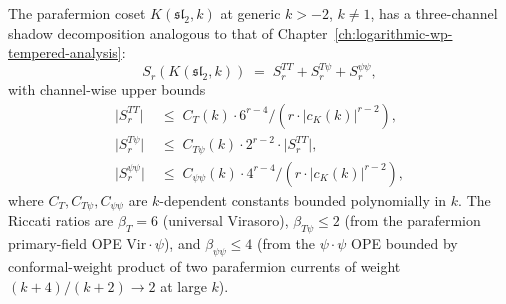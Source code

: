 \begin{proposition}
\label{prop:parafermion-channel-decomposition}
\ClaimStatusProvedHere
The parafermion coset $K(\mathfrak{sl}_2, k)$ at generic $k > -2$,
$k \neq 1$, has a three-channel shadow decomposition analogous to
that of Chapter~\ref{ch:logarithmic-wp-tempered-analysis}:
\[
 S_r(K(\mathfrak{sl}_2, k))
 \;=\;
 S_r^{TT} + S_r^{T\psi} + S_r^{\psi\psi},
\]
with channel-wise upper bounds
\begin{align*}
 \lvert S_r^{TT} \rvert
 &\;\le\; C_T(k) \cdot 6^{r-4} / (r \cdot \lvert c_K(k) \rvert^{r-2}), \\
 \lvert S_r^{T\psi} \rvert
 &\;\le\; C_{T\psi}(k) \cdot 2^{r-2} \cdot \lvert S_r^{TT} \rvert, \\
 \lvert S_r^{\psi\psi} \rvert
 &\;\le\; C_{\psi\psi}(k) \cdot 4^{r-4} / (r \cdot \lvert c_K(k) \rvert^{r-2}),
\end{align*}
where $C_T, C_{T\psi}, C_{\psi\psi}$ are $k$-dependent constants
bounded polynomially in $k$. The Riccati ratios are
$\beta_T = 6$ (universal Virasoro), $\beta_{T\psi} \le 2$
(from the parafermion primary-field OPE
$\mathrm{Vir} \cdot \psi$), and $\beta_{\psi\psi} \le 4$ (from the
$\psi \cdot \psi$ OPE bounded by conformal-weight product of two
parafermion currents of weight $(k + 4)/(k + 2) \to 2$ at large
$k$).
\end{proposition}

